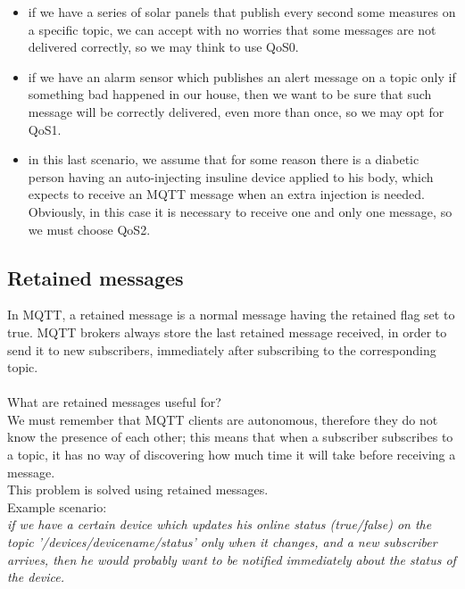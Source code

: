 \documentclass[12pt]{report}
\begin{document}
{{\begin{itemize}
\setlength{\itemindent}{+4mm}
\item if we have a series of solar panels that publish every second some measures on a specific topic, we can accept with no worries that some messages are not delivered correctly, so we may think to use QoS0.
\item if we have an alarm sensor which publishes an alert message on a topic only if something bad happened in our house, then we want to be sure that such message will be correctly delivered, even more than once, so we may opt for QoS1.
\item in this last scenario, we assume that for some reason there is a diabetic person having an auto-injecting insuline device applied to his body, which expects to receive an MQTT message when an extra injection is needed.\\Obviously, in this case it is necessary to receive one and only one message, so we must choose QoS2.
\end{itemize}

\bigskip
\subsection{Retained messages}
\bigskip
In MQTT, a retained message is a normal message having the retained flag set to true.
MQTT brokers always store the last retained message received, in order to send it to new subscribers, immediately after subscribing to the corresponding topic.\\\\
What are retained messages useful for?\\

We must remember that MQTT clients are autonomous, therefore they do not know the presence of each other; this means that when a subscriber subscribes to a topic, it has no way of discovering how much time it will take before receiving a message.\\
This problem is solved using retained messages.\\

Example scenario: \\

\emph{if we have a certain device which updates his online status (true/false) on the topic '/devices/devicename/status' only when it changes, and a new subscriber arrives, then he would probably want to be notified immediately about the status of the device.}

}}
\end{document}
